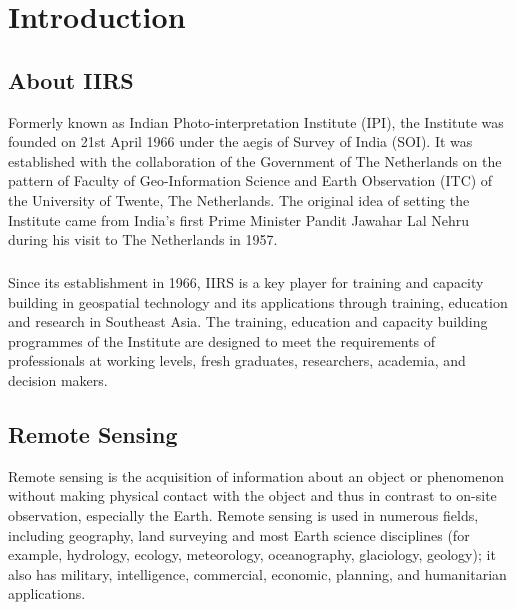 \documentclass[12pt, a4paper]{report}
\begin{document}
\tableofcontents
\listoffigures

\setcounter{page}{1}
\setcounter{secnumdepth}{2}
\chapter{Introduction}
\section{About IIRS}
Formerly known as Indian Photo-interpretation Institute (IPI), the Institute was founded on 21st April 1966 under the aegis of Survey of India (SOI). It was established with the collaboration of the Government of The Netherlands on the pattern of Faculty of Geo-Information Science and Earth Observation (ITC) of the University of Twente, The Netherlands. The original idea of setting the Institute came from India's first Prime Minister Pandit Jawahar Lal Nehru during his visit to The Netherlands in 1957. 
\paragraph{}
Since its establishment in 1966, IIRS is a key player for training and capacity building in geospatial technology and its applications through training, education and research in Southeast Asia. The training, education and capacity building programmes of the Institute are designed to meet the requirements of professionals at working levels, fresh graduates, researchers, academia, and decision makers.
\cite{iirs.about.history, iirs.about.instiprof}
\section{Remote Sensing}
Remote sensing is the acquisition of information about an object or phenomenon without making physical contact with the object and thus in contrast to on-site observation, especially the Earth. Remote sensing is used in numerous fields, including geography, land surveying and most Earth science disciplines (for example, hydrology, ecology, meteorology, oceanography, glaciology, geology); it also has military, intelligence, commercial, economic, planning, and humanitarian applications.
\end{document}
